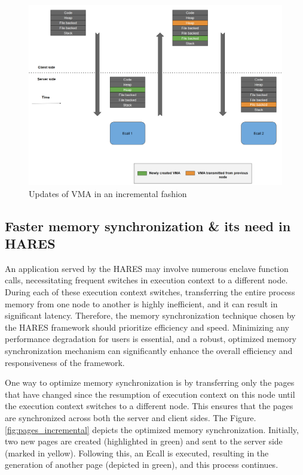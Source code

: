 \documentclass[article, doublespace,nopageskip]{VTthesis} %
\newcommand{\monitor}{HARES }
\begin{document}
    \begin{figure}[htb]
	    \centering
		\includegraphics[scale=0.7]{figures/incremental_vmas.png}
		\caption{Updates of VMA in an incremental fashion} 
		\label{fig:vmas_incremental}
	\end{figure}

    \subsection{Faster memory synchronization \& its need in \monitor}
    An application served by the \monitor may involve numerous enclave function calls, necessitating frequent switches in execution context to a different node. During each of these execution context switches, transferring the entire process memory from one node to another is highly inefficient, and it can result in significant latency. Therefore, the memory synchronization technique chosen by the \monitor framework should prioritize efficiency and speed. Minimizing any performance degradation for users is essential, and a robust, optimized memory synchronization mechanism can significantly enhance the overall efficiency and responsiveness of the framework.

    One way to optimize memory synchronization is by transferring only the pages that have changed since the resumption of execution context on this node until the execution context switches to a different node. This ensures that the pages are synchronized across both the server and client sides. The Figure.\ref{fig:pages_incremental} depicts the optimized memory synchronization. Initially, two new pages are created (highlighted in green) and sent to the server side (marked in yellow). Following this, an Ecall is executed, resulting in the generation of another page (depicted in green), and this process continues.
\end{document}
